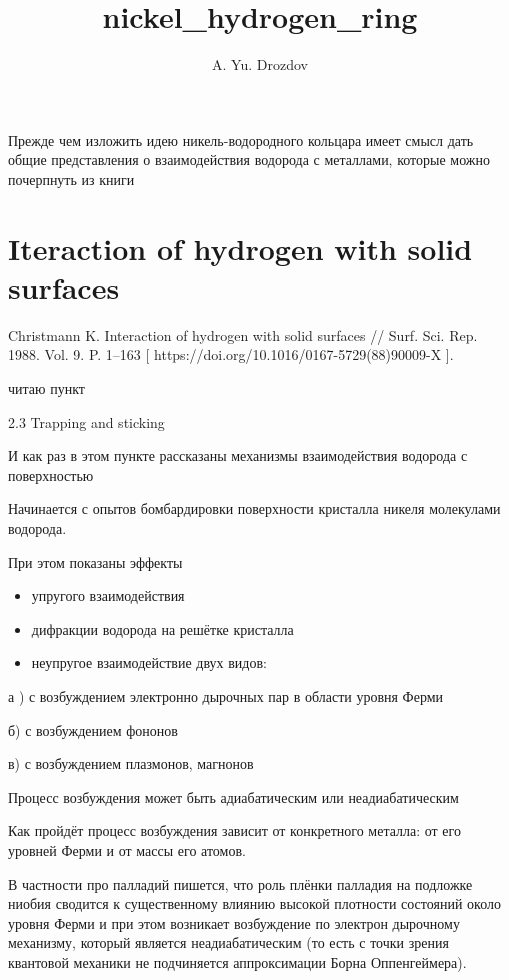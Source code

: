 \documentclass[11pt]{article}
\author{A. Yu. Drozdov}
\title{nickel\_hydrogen\_ring}
\providecommand{\tightlist}{%
      \setlength{\itemsep}{0pt}\setlength{\parskip}{0pt}}
\begin{document}
    
    \maketitle
    
    

    
    Прежде чем изложить идею никель-водородного кольцара имеет смысл дать
общие представления о взаимодействия водорода с металлами, которые можно
почерпнуть из книги

    \section{Iteraction of hydrogen with solid
surfaces}\label{iteraction-of-hydrogen-with-solid-surfaces}

    Christmann K. Interaction of hydrogen with solid surfaces // Surf. Sci.
Rep. 1988. Vol. 9. P. 1--163 {[}
https://doi.org/10.1016/0167-5729(88)90009-X {]}.

читаю пункт

2.3 Trapping and sticking

И как раз в этом пункте рассказаны механизмы взаимодействия водорода с
поверхностью

Начинается с опытов бомбардировки поверхности кристалла никеля
молекулами водорода.

При этом показаны эффекты

\begin{itemize}
\tightlist
\item
  упругого взаимодействия
\item
  дифракции водорода на решётке кристалла
\item
  неупругое взаимодействие двух видов:
\end{itemize}

а ) с возбуждением электронно дырочных пар в области уровня Ферми

б) с возбуждением фононов

в) с возбуждением плазмонов, магнонов

Процесс возбуждения может быть адиабатическим или неадиабатическим

Как пройдёт процесс возбуждения зависит от конкретного металла: от его
уровней Ферми и от массы его атомов.

В частности про палладий пишется, что роль плёнки палладия на подложке
ниобия сводится к существенному влиянию высокой плотности состояний
около уровня Ферми и при этом возникает возбуждение по электрон
дырочному механизму, который является неадиабатическим (то есть с точки
зрения квантовой механики не подчиняется аппроксимации Борна
Оппенгеймера).
\end{document}
